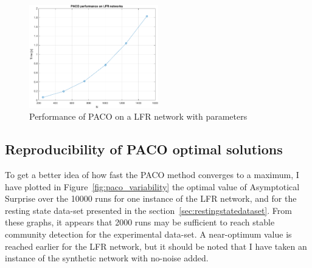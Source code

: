 \begin{figure}[!htb]
\centering
\includegraphics[width=0.5\textwidth]{images/paco_benchmark.pdf}
\caption{Performance of PACO on a LFR network with parameters}
\label{fig:paco_benchmark}
\end{figure}

\subsection{Reproducibility of PACO optimal solutions}
To get a better idea of how fast the PACO method converges to a maximum, I have plotted in Figure~\ref{fig:paco_variability} the optimal value of Asymptotical Surprise over the 10000 runs for one instance of the LFR network, and for the resting state data-set presented in the section~\ref{sec:restingstatedataset}.
From these graphs, it appears that 2000 runs may be sufficient to reach stable community detection for the experimental data-set.
A near-optimum value is reached earlier for the LFR network, but it should be noted that I have taken an instance of the synthetic network with no-noise added.

